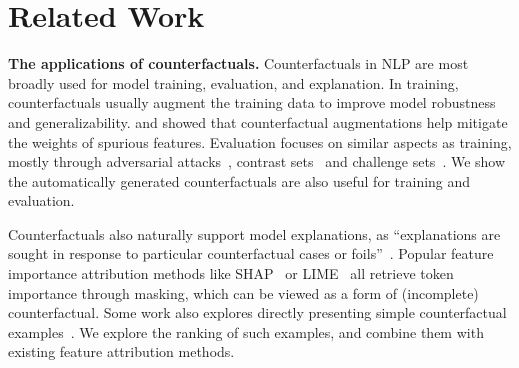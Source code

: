 \section{Related Work}
\label{sec:relate}

\textbf{The applications of counterfactuals.}
Counterfactuals in NLP are most broadly used for model training, evaluation, and explanation.
In training, counterfactuals usually augment the training data to improve model robustness~\cite{garg2019counterfactual, Wu2019ConditionalBC, Wei2019EDAED, Kumar2020DataAU} and generalizability.
\citet{kaushik2019learning} and \citet{teney2020learning} showed that counterfactual augmentations help mitigate the weights of spurious features.
Evaluation focuses on similar aspects as training, mostly through adversarial attacks~\cite{Song2020UniversalAA}, contrast sets~\cite{kaushik2019learning} and challenge sets~\cite{Geiger2019PosingFG, liu-etal-2019-inoculation}.
We show the automatically generated counterfactuals are also useful for training and evaluation.

Counterfactuals also naturally support model explanations, as ``explanations are sought in response to particular counterfactual cases or foils''~\cite{miller}.
Popular feature importance attribution methods like SHAP~\cite{NIPS2017_7062} or LIME~\cite{Ribeiro2016WhySI} all retrieve token importance through masking, which can be viewed as a form of (incomplete) counterfactual.
Some work also explores directly presenting simple counterfactual examples~\cite{hase2020evaluating, vig2020causal, kang2020counterfactual}.
We explore the ranking of such examples, and combine them with existing feature attribution methods.

